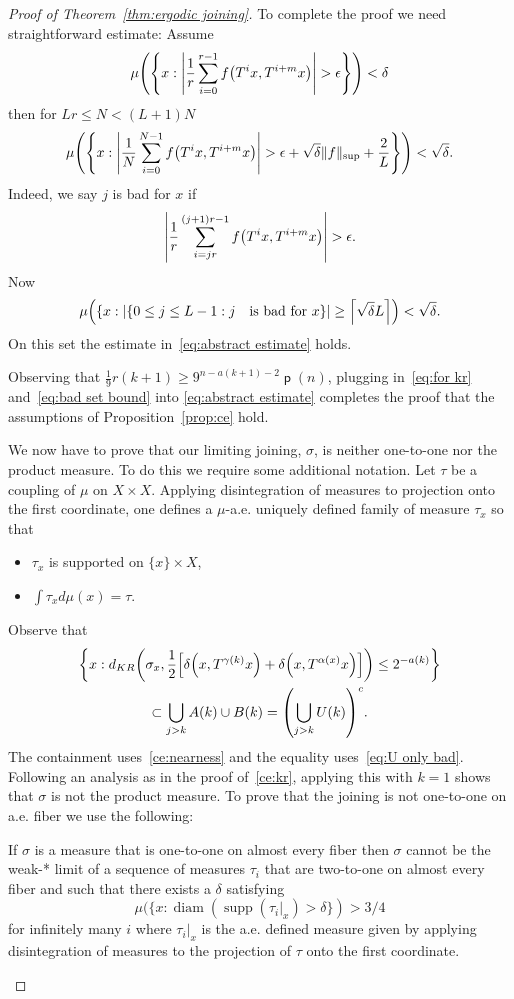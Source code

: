 \documentclass[AHL,Unicode,longabstracts,published]{cedram}
\DeclareMathOperator{\p}{\mathsf{p}}
\DeclareMathOperator{\supp}{supp}
\DeclareMathOperator{\diam}{diam}
\let\originalleft\left
\let\originalright\right
\renewcommand{\left}{\mathopen{}\mathclose\bgroup\originalleft}
\renewcommand{\right}{\aftergroup\egroup\originalright}
\begin{document}
\begin{proof}[Proof of Theorem~\ref{thm:ergodic joining}]
To complete the proof we need straightforward estimate:
Assume
\[
\mu \left(\left\{ x: \left| \frac 1 r \sum_{i=0}^{r-1}f\left(T^ix,T^{i+m}x\right) \right| >\epsilon \right\} \right)<\delta
\]
then for $Lr\leq N<(L+1)N$
\begin{equation}\label{eq:abstract estimate}
\mu \left(\left\{ x : \left| \frac 1 N \sum_{i=0}^{N-1}f\left(T^ix,T^{i+m}x\right) \right| >\epsilon+\sqrt{\delta}\|f\|_{\sup}+\frac 2 {L} \right\} \right) < \sqrt{\delta}.
\end{equation}
Indeed, we say $j$ is bad for $x$ if
\[
\left| \frac 1 r \sum_{i=jr}^{(j+1)r-1}f\left(T^ix,T^{i+m}x\right) \right| >\epsilon.
\]
Now
\[
\mu\left(
\{x: |\{0\leq j\leq L-1:j \quad\text{is bad for }x\}|\geq \left\lceil \sqrt{\delta}L\right\rceil \right)<\sqrt{\delta}.
\]
On this set the estimate in~\eqref{eq:abstract estimate} holds.

Observing that $\frac 1 9 r(k+1)\geq 9^{n-a(k+1)-2} \p(n)$, plugging in~\eqref{eq:for kr} and~\eqref{eq:bad set bound} into \eqref{eq:abstract estimate} completes the proof that the assumptions of Proposition~\ref{prop:ce} hold.


We now have to prove that our limiting joining, $\sigma$, is neither one-to-one nor the product measure. To do this we require some additional notation. Let $\tau$ be a coupling of $\mu$ on $X \times X$. Applying disintegration of measures to projection onto the first coordinate, one defines a $\mu$-a.e. uniquely defined family of measure $\tau_x$ so that
\begin{itemize}
\item $\tau_x$ is supported on $\{x\} \times X$,
\item $\int \tau_xd\mu(x)=\tau$.
\end{itemize}
Observe that
\begin{multline}\label{eq:disintegration understood}
\left\{x:d_{KR}\left(\sigma_x, \frac 1 2 \left[\delta\left(x,T^{\gamma(k)}x\right)+\delta\left(x,T^{\alpha(x)}x\right)\right]\right)\leq 2^{-a(k)} \right\}\\
\subset \bigcup_{j>k}A(k) \cup B(k)= \left(\bigcup_{j>k}U(k)\right)^c.
\end{multline}
The containment uses~\eqref{ce:nearness} and the equality uses~\eqref{eq:U only bad}. Following an analysis as in the proof of~\eqref{ce:kr}, applying this with $k=1$ shows that $\sigma$ is not the product measure. To prove that the joining is not one-to-one on a.e. fiber we use the following:

\begin{lemm}[{\cite[Lemma~4.7]{MR4269425}}]
If $\sigma$ is a measure that is one-to-one on almost every fiber then $\sigma$ cannot be the weak-* limit of a sequence of measures $\tau_i$ that are two-to-one on almost every fiber and such that there exists a $\delta$ satisfying
\[
\mu(\{x : \diam(\supp(\tau_i|_x) > \delta\}) > 3/4
\]
for infinitely many $i$ where $\tau_i|_x$ is the a.e. defined measure given by applying disintegration of measures to the projection of $\tau$ onto the first coordinate.
\end{lemm}


\end{proof}
\end{document}
